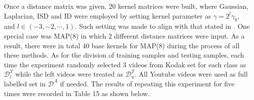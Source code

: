 \noindent Once a distance matrix was given, 20 kernel matrices were built, where Gaussian, Laplacian, ISD and ID were employed by setting kernel parameter as $\gamma = 2^l \gamma_0$, and $l \in (-3, -2,\cdots, 1)$. Such setting was made to align with that stated in \cite{duan2012visual}. One special case was MAP(8) in which 2 different distance matrices were input. As a result, there were in total 40 base kernels for MAP(8) during the process of all these methods. As for the division of training samples and testing samples, each time the experiment randomly selected 3 videos from Kodak set for each class as $\mathcal{D}_l^T$ while the left videos were treated as $\mathcal{D}_u^T$. All Youtube videos were used as full labelled set in $\mathcal{D}^A$ if needed. The results of repeating this experiment for five times were recorded in Table 15 as shown below.\\

\begin{table}[!ht]
  \begin{center}
    \end{center}
    \caption{Experimental settings}
\end{table}


